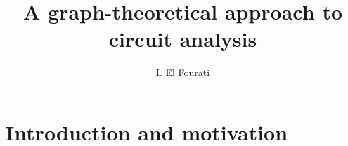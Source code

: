 \documentclass{book}
\title{A graph-theoretical approach to circuit analysis}
\author{I. El Fourati}
\date{}
\begin{document}
    \maketitle

    \chapter{Introduction and motivation}
\end{document}
